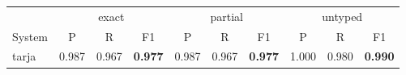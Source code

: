 \begin{tabular}{lccccccccc}
\toprule
 & \multicolumn{3}{c}{exact} & \multicolumn{3}{c}{partial} & \multicolumn{3}{c}{untyped} \\
System & P & R & F1 & P & R & F1 & P & R & F1 \\
\midrule
tarja & 0.987 & 0.967 & \textbf{0.977} & 0.987 & 0.967 & \textbf{0.977} & 1.000 & 0.980 & \textbf{0.990} \\
\bottomrule
\end{tabular}
